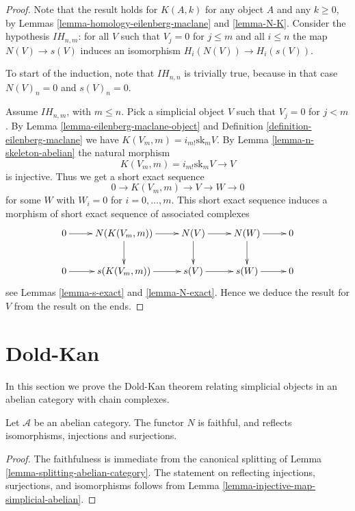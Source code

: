\begin{proof}
Note that the result holds for $K(A, k)$ for
any object $A$ and any $k \geq 0$, by Lemmas
\ref{lemma-homology-eilenberg-maclane} and \ref{lemma-N-K}.
Consider the hypothesis $IH_{n, m}$:
for all $V$ such that $V_j = 0$ for
$j \leq m$ and all $i \leq n$ the map
$N(V) \to s(V)$ induces an isomorphism
$H_i(N(V)) \to H_i(s(V))$.

\medskip\noindent
To start of the induction, note that $IH_{n, n}$
is trivially true, because in that case $N(V)_n = 0$
and $s(V)_n = 0$.

\medskip\noindent
Assume $IH_{n, m}$, with $m \leq n$.
Pick a simplicial object $V$ such that
$V_j = 0$ for $j < m$. By Lemma \ref{lemma-eilenberg-maclane-object}
and Definition \ref{definition-eilenberg-maclane}
we have $K(V_m, m) = i_{m!} \text{sk}_mV$.
By Lemma \ref{lemma-n-skeleton-abelian} the natural morphism
$$
K(V_m, m) = i_{m!} \text{sk}_mV \to V
$$
is injective. Thus we get a short exact sequence
$$
0 \to K(V_m, m) \to V \to W \to 0
$$
for some $W$ with $W_i = 0$ for $i = 0, \ldots, m$. This short exact sequence
induces a morphism of short exact sequence of associated complexes
$$
\xymatrix{
0 \ar[r] &
N(K(V_m, m)) \ar[r] \ar[d] &
N(V) \ar[r] \ar[d] &
N(W) \ar[r] \ar[d] &
0 \\
0 \ar[r] &
s(K(V_m, m)) \ar[r] &
s(V) \ar[r] &
s(W) \ar[r] &
0
}
$$
see Lemmas \ref{lemma-s-exact} and \ref{lemma-N-exact}.
Hence we deduce the result for $V$ from the result
on the ends.
\end{proof}






\section{Dold-Kan}
\label{section-dold-kan}

\noindent
In this section we prove the Dold-Kan theorem relating
simplicial objects in an abelian category with chain complexes.

\begin{lemma}
\label{lemma-N-faithful}
Let $\mathcal{A}$ be an abelian category.
The functor $N$ is faithful, and reflects
isomorphisms, injections and surjections.
\end{lemma}

\begin{proof}
The faithfulness is immediate from the canonical
splitting of Lemma \ref{lemma-splitting-abelian-category}.
The statement on reflecting injections, surjections, and
isomorphisms follows from
Lemma \ref{lemma-injective-map-simplicial-abelian}.
\end{proof}

